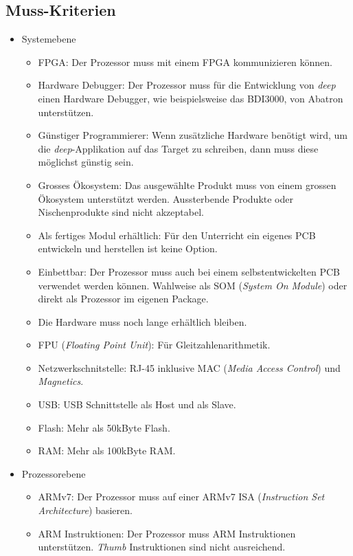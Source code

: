 \subsection{Muss-Kriterien}
\begin{itemize}
\item Systemebene
	\begin{itemize}
	\item FPGA: Der Prozessor muss mit einem FPGA kommunizieren können.
	\item Hardware Debugger: Der Prozessor muss für die Entwicklung von \textit{deep} einen Hardware Debugger, wie beispielsweise das BDI3000, von Abatron unterstützen. 
	\item Günstiger Programmierer: Wenn zusätzliche Hardware benötigt wird, um die \textit{deep}-Applikation auf das Target zu schreiben, dann muss diese möglichst günstig sein.
	\item Grosses Ökosystem: Das ausgewählte Produkt muss von einem grossen Ökosystem unterstützt werden. Aussterbende Produkte oder Nischenprodukte sind nicht akzeptabel.
	\item Als fertiges Modul erhältlich: Für den Unterricht ein eigenes PCB entwickeln und herstellen ist keine Option.
	\item Einbettbar: Der Prozessor muss auch bei einem selbstentwickelten PCB verwendet werden können. Wahlweise als SOM (\textit{System On Module}) oder direkt als Prozessor im eigenen Package.
	\item Die Hardware muss noch lange erhältlich bleiben.
	\item FPU (\textit{Floating Point Unit}): Für Gleitzahlenarithmetik.
	\item Netzwerkschnitstelle: RJ-45 inklusive MAC (\textit{Media Access Control}) und \textit{Magnetics}.
	\item USB: USB Schnittstelle als Host und als Slave.
	\item Flash: Mehr als 50kByte Flash.
	\item RAM: Mehr als 100kByte RAM.
	\end{itemize}
\item Prozessorebene
	\begin{itemize}
	\item ARMv7: Der Prozessor muss auf einer ARMv7 ISA (\textit{Instruction Set Architecture}) basieren.
	\item ARM Instruktionen: Der Prozessor muss ARM Instruktionen unterstützen. \textit{Thumb} Instruktionen sind nicht ausreichend.
	\end{itemize}
\end{itemize}



